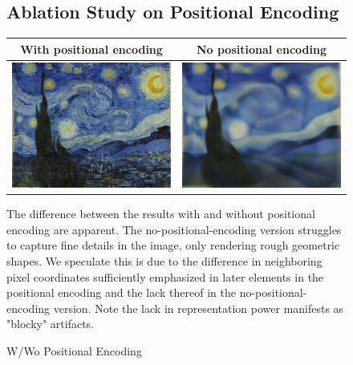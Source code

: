 \documentclass{article}
\begin{document}
\begin{figure}[h]
\subsection{Ablation Study on Positional Encoding}
    \begin{tabular}{c c}
       With positional encoding  & No positional encoding \\ 
       \midrule
        \includegraphics[width=0.5\linewidth]{no-15-norm-norm-pred.png} & \includegraphics[width=0.5\linewidth]{pe-15-norm-norm-pred.png}
    \end{tabular}
    \caption{W/Wo Positional Encoding}

The difference between the results with and without positional encoding are apparent. The no-positional-encoding version struggles to capture fine details in the image, only rendering rough geometric shapes. We speculate this is due to the difference in neighboring pixel coordinates sufficiently emphasized in later elements in the positional encoding and the lack thereof in the no-positional-encoding version. Note the lack in representation power manifests as "blocky" artifacts.

\end{figure}
\end{document}
